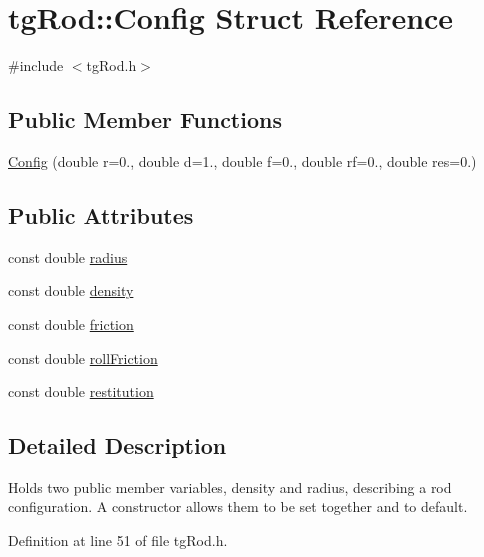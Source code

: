 \hypertarget{structtg_rod_1_1_config}{\section{tg\-Rod\-:\-:Config Struct Reference}
\label{structtg_rod_1_1_config}
}


{\ttfamily \#include $<$tg\-Rod.\-h$>$}

\subsection*{Public Member Functions}
\begin{DoxyCompactItemize}
\item 
\hyperlink{structtg_rod_1_1_config_ae4f5148db61532a98c75d34dd97a186f}{Config} (double r=0., double d=1., double f=0., double rf=0., double res=0.)
\end{DoxyCompactItemize}
\subsection*{Public Attributes}
\begin{DoxyCompactItemize}
\item 
const double \hyperlink{structtg_rod_1_1_config_a20c2370d27608ee1d7e8521095f6b0df}{radius}
\item 
const double \hyperlink{structtg_rod_1_1_config_ad4949cc9e0d084a5d0907ee6b89616c7}{density}
\item 
const double \hyperlink{structtg_rod_1_1_config_a7c85c2b9b8f2d30fea1a8c5e498b2fd6}{friction}
\item 
const double \hyperlink{structtg_rod_1_1_config_a99421c0930dce83ed7721fe899611e7c}{roll\-Friction}
\item 
const double \hyperlink{structtg_rod_1_1_config_aa16247d472088ec2476f409da5f92f87}{restitution}
\end{DoxyCompactItemize}


\subsection{Detailed Description}
Holds two public member variables, density and radius, describing a rod configuration. A constructor allows them to be set together and to default. 

Definition at line 51 of file tg\-Rod.\-h.



